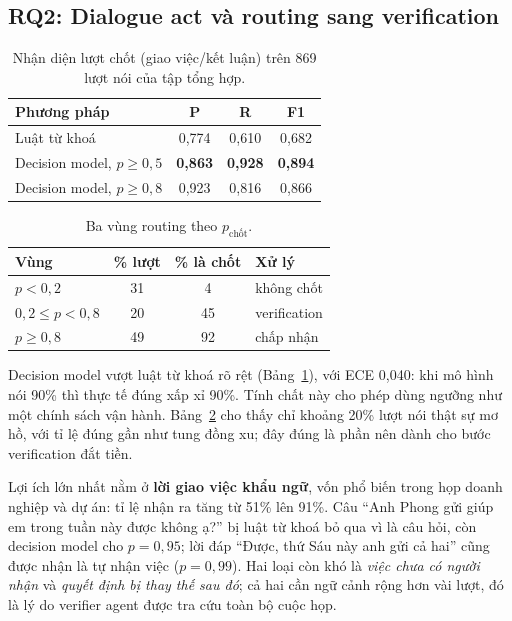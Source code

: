 \documentclass[11pt]{article}
\newcommand{\pchot}{p_{\text{chốt}}}
\begin{document}
\subsection{RQ2: Dialogue act và routing sang verification}
\label{sec:rq2}

\begin{table}[t]
\centering\small
\begin{tabular}{@{}lccc@{}}
\toprule
\textbf{Phương pháp} & \textbf{P} & \textbf{R} & \textbf{F1} \\
\midrule
Luật từ khoá & 0,774 & 0,610 & 0,682 \\
Decision model, $p\ge0{,}5$ & \textbf{0,863} & \textbf{0,928} & \textbf{0,894} \\
Decision model, $p\ge0{,}8$ & 0,923 & 0,816 & 0,866 \\
\bottomrule
\end{tabular}
\caption{Nhận diện lượt chốt (giao việc/kết luận) trên 869 lượt nói của tập tổng hợp.}
\label{tab:turnact}
\end{table}

\begin{table}[t]
\centering\small
\begin{tabular}{@{}lccl@{}}
\toprule
\textbf{Vùng} & \textbf{\% lượt} & \textbf{\% là chốt} & \textbf{Xử lý} \\
\midrule
$p<0{,}2$ & 31 & 4 & không chốt \\
$0{,}2\le p<0{,}8$ & 20 & 45 & verification \\
$p\ge0{,}8$ & 49 & 92 & chấp nhận \\
\bottomrule
\end{tabular}
\caption{Ba vùng routing theo $\pchot$.}
\label{tab:zones}
\end{table}

Decision model vượt luật từ khoá rõ rệt (Bảng~\ref{tab:turnact}), với ECE 0,040: khi mô hình nói 90\%
thì thực tế đúng xấp xỉ 90\%. Tính chất này cho phép dùng ngưỡng như một chính sách vận hành.
Bảng~\ref{tab:zones} cho thấy chỉ khoảng 20\% lượt nói thật sự mơ hồ, với tỉ lệ đúng gần như tung đồng
xu; đây đúng là phần nên dành cho bước verification đắt tiền.

Lợi ích lớn nhất nằm ở \textbf{lời giao việc khẩu ngữ}, vốn phổ biến trong họp doanh nghiệp và dự án:
tỉ lệ nhận ra tăng từ 51\% lên 91\%. Câu ``Anh Phong gửi giúp em trong tuần này được không ạ?'' bị luật
từ khoá bỏ qua vì là câu hỏi, còn decision model cho $p=0{,}95$; lời đáp ``Được, thứ Sáu này anh gửi cả
hai'' cũng được nhận là tự nhận việc ($p=0{,}99$). Hai loại còn khó là \emph{việc chưa có người nhận} và
\emph{quyết định bị thay thế sau đó}; cả hai cần ngữ cảnh rộng hơn vài lượt, đó là lý do verifier agent
được tra cứu toàn bộ cuộc họp.
\end{document}
